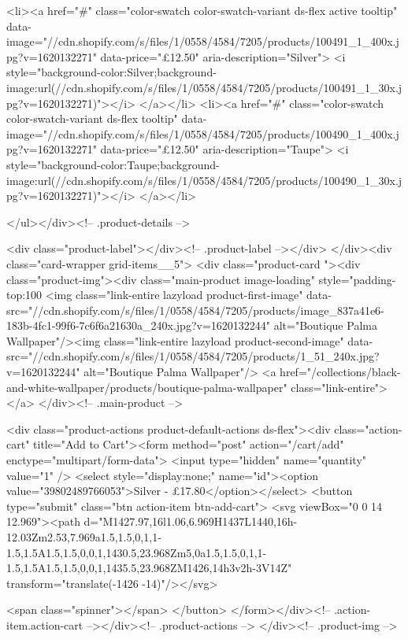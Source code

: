 {{{{{{{<li><a href="#" class="color-swatch color-swatch-variant ds-flex active tooltip" data-image="//cdn.shopify.com/s/files/1/0558/4584/7205/products/100491_1_400x.jpg?v=1620132271" data-price="£12.50" aria-description="Silver">
              <i style="background-color:Silver;background-image:url(//cdn.shopify.com/s/files/1/0558/4584/7205/products/100491_1_30x.jpg?v=1620132271)"></i>
            </a></li>
<li><a href="#" class="color-swatch color-swatch-variant ds-flex tooltip" data-image="//cdn.shopify.com/s/files/1/0558/4584/7205/products/100490_1_400x.jpg?v=1620132271" data-price="£12.50" aria-description="Taupe">
              <i style="background-color:Taupe;background-image:url(//cdn.shopify.com/s/files/1/0558/4584/7205/products/100490_1_30x.jpg?v=1620132271)"></i>
            </a></li>

      </ul></div><!-- .product-details -->

<div class="product-label"></div><!-- .product-label --></div>
          </div><div class="card-wrapper grid-items__5">
            <div class="product-card "><div class="product-img"><div class="main-product image-loading" style="padding-top:100%
      <img class="link-entire lazyload product-first-image" data-src="//cdn.shopify.com/s/files/1/0558/4584/7205/products/image_837a41e6-183b-4fc1-99f6-7c6f6a21630a_240x.jpg?v=1620132244" alt="Boutique Palma Wallpaper"/><img class="link-entire lazyload product-second-image" data-src="//cdn.shopify.com/s/files/1/0558/4584/7205/products/1_51_240x.jpg?v=1620132244" alt="Boutique Palma Wallpaper"/>
      <a href="/collections/black-and-white-wallpaper/products/boutique-palma-wallpaper" class="link-entire"></a>
    </div><!-- .main-product -->
  
<div class="product-actions product-default-actions ds-flex"><div class="action-cart" title="Add to Cart"><form method="post" action="/cart/add" enctype="multipart/form-data">
            <input type="hidden" name="quantity" value="1" />
            <select style="display:none;" name="id"><option value="39802489766053">Silver - £17.80</option></select>
            <button type="submit" class="btn action-item btn-add-cart">
              <svg viewBox="0 0 14 12.969"><path d="M1427.97,16l1.06,6.969H1437L1440,16h-12.03Zm2.53,7.969a1.5,1.5,0,1,1-1.5,1.5A1.5,1.5,0,0,1,1430.5,23.968Zm5,0a1.5,1.5,0,1,1-1.5,1.5A1.5,1.5,0,0,1,1435.5,23.968ZM1426,14h3v2h-3V14Z" transform="translate(-1426 -14)"/></svg>

              <span class="spinner"></span>
            </button>
          </form></div><!-- .action-item.action-cart --></div><!-- .product-actions -->
</div><!-- .product-img -->

}}}}}}}
